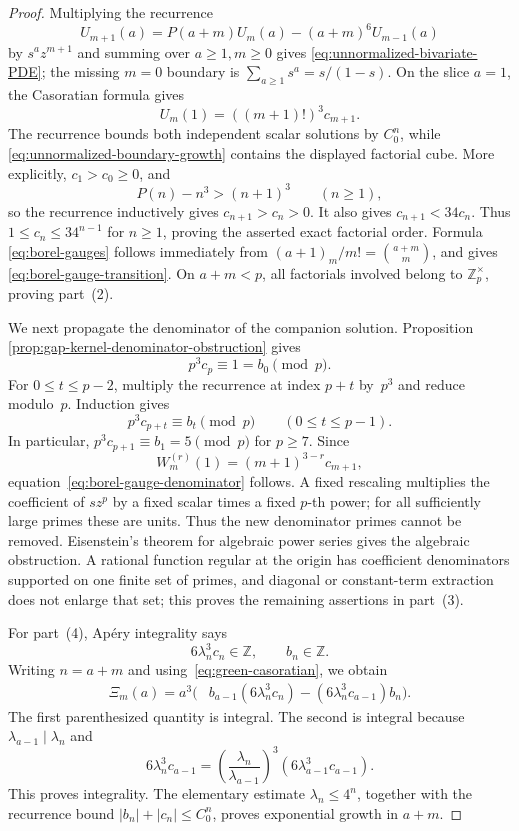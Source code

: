 \begin{proof}
Multiplying the recurrence
\[
 U_{m+1}(a)=P(a+m)U_m(a)-(a+m)^6U_{m-1}(a)
\]
by $s^az^{m+1}$ and summing over $a\geq1,m\geq0$ gives
\eqref{eq:unnormalized-bivariate-PDE}; the missing $m=0$ boundary is
$\sum_{a\geq1}s^a=s/(1-s)$.  On the slice $a=1$, the Casoratian formula
gives
\begin{equation}
 U_m(1)=((m+1)!)^3c_{m+1}.
 \label{eq:unnormalized-boundary-growth}
\end{equation}
The recurrence bounds both independent scalar solutions by $C_0^n$, while
\eqref{eq:unnormalized-boundary-growth} contains the displayed factorial
cube.  More explicitly, $c_1>c_0\geq0$, and
\[
 P(n)-n^3>(n+1)^3\qquad(n\geq1),
\]
so the recurrence inductively gives $c_{n+1}>c_n>0$.  It also gives
$c_{n+1}<34c_n$.  Thus $1\leq c_n\leq34^{n-1}$ for $n\geq1$, proving the
asserted exact factorial order.  Formula
\eqref{eq:borel-gauges} follows immediately from
$(a+1)_m/m!=\binom{a+m}{m}$, and gives
\eqref{eq:borel-gauge-transition}.  On $a+m<p$, all factorials involved
belong to $\mathbb Z_p^\times$, proving part~(2).

We next propagate the denominator of the companion solution.  Proposition
\ref{prop:gap-kernel-denominator-obstruction} gives
\[
 p^3c_p\equiv1=b_0\pmod p.
\]
For $0\leq t\leq p-2$, multiply the recurrence at index $p+t$ by~$p^3$
and reduce modulo~$p$.  Induction gives
\begin{equation}
 p^3c_{p+t}\equiv b_t\pmod p
 \qquad(0\leq t\leq p-1).
 \label{eq:companion-denominator-propagation}
\end{equation}
In particular, $p^3c_{p+1}\equiv b_1=5\pmod p$ for $p\geq7$.  Since
\[
 W_m^{(r)}(1)=(m+1)^{3-r}c_{m+1},
\]
equation~\eqref{eq:borel-gauge-denominator} follows.  A fixed rescaling
multiplies the coefficient of $s z^p$ by a fixed scalar times a fixed
$p$-th power; for all sufficiently large primes these are units.  Thus the
new denominator primes cannot be removed.  Eisenstein's theorem for
algebraic power series gives the algebraic obstruction.  A rational
function regular at the origin has coefficient denominators supported on
one finite set of primes, and diagonal or constant-term extraction does not
enlarge that set; this proves the remaining assertions in part~(3).

For part~(4), Ap\'ery integrality says
\[
 6\lambda_n^3c_n\in\mathbb Z,
 \qquad b_n\in\mathbb Z.
\]
Writing $n=a+m$ and using~\eqref{eq:green-casoratian}, we obtain
\begin{align*}
 \Xi_m(a)=a^3\bigl(&b_{a-1}(6\lambda_n^3c_n)
             -(6\lambda_n^3c_{a-1})b_n\bigr).
 \label{eq:lcm-gap-integrality}
\end{align*}
The first parenthesized quantity is integral.  The second is integral
because $\lambda_{a-1}\mid\lambda_n$ and
\[
 6\lambda_n^3c_{a-1}
 =\left(\frac{\lambda_n}{\lambda_{a-1}}\right)^3
  (6\lambda_{a-1}^3c_{a-1}).
\]
This proves integrality.  The elementary estimate
$\lambda_n\leq4^n$, together with the recurrence bound
$|b_n|+|c_n|\leq C_0^n$, proves exponential growth in $a+m$.


\end{proof}
